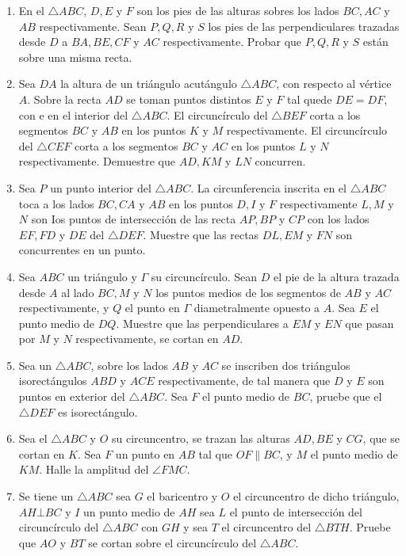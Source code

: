 \documentclass{book}
\begin{document}
\begin{enumerate}
        \item En el $\triangle ABC$, $D ,E$ y $F$ son los pies de las alturas sobres los lados $BC,AC$ y $AB$ respectivamente. Sean $P,Q,R$ y $S$ los pies de las perpendiculares trazadas desde $D$ a $BA, BE, CF$ y $AC$ respectivamente. Probar que $P, Q, R$ y $S$ están sobre una misma recta.
        \item Sea $DA$ la altura de un triángulo acutángulo $\triangle ABC$, con respecto al vértice $A$. Sobre la recta $AD$ se toman puntos distintos $E$ y $F$ tal quede $DE=DF$, con e en el interior del $\triangle ABC$. El circuncírculo del $\triangle BEF$ corta a los segmentos $BC$ y $AB$ en los puntos $K$ y $M$ respectivamente. El circuncírculo del $\triangle CEF$ corta a los segmentos $BC$ y $AC$ en los puntos $L$ y $N$ respectivamente. Demuestre que $AD, KM$ y $LN$ concurren.
        \item Sea $P$ un punto interior del $\triangle ABC$. La circunferencia inscrita en el $\triangle ABC$ toca a los lados $BC,CA$ y $AB$ en los puntos $D,I$ y $F$ respectivamente $L,M$ y $N$ son Ios puntos de intersección de las recta $AP,BP$ y $CP$ con los lados $EF,FD$ y $DE$ del $\triangle DEF$. Muestre que las rectas $DL,EM$ y $FN$ son concurrentes en un punto.
        \item Sea $ABC$ un triángulo y $\Gamma$ su circuncírculo. Sean $D$ el pie de la altura trazada desde $A$ al lado $BC, M$ y $N$ los puntos medios de los segmentos de $AB$ y $AC$ respectivamente, y $Q$ el punto en $\Gamma$ diametralmente opuesto a $A$. Sea $E$ el punto medio de $DQ$. Muestre que las perpendiculares a $EM$ y $EN$ que pasan por $M$ y $N$ respectivamente, se cortan en $AD$.
        \item Sea un $\triangle ABC$, sobre los lados $AB$ y $AC$ se inscriben dos triángulos isorectángulos $ABD$ y $ACE$ respectivamente, de tal manera que $D$ y $E$ son puntos en exterior del $\triangle ABC$. Sea $F$ el punto medio de $BC$, pruebe que el $\triangle DEF$ es isorectángulo.
        \item Sea el $\triangle ABC$  y $O$ su circuncentro, se trazan las alturas $AD, BE$ y $CG$, que se cortan en $K$. Sea $F$ un punto en $AB$ tal que $OF \| BC$, y $M$ el punto medio de $KM$. Halle la amplitud del $\angle FMC$.
        \item Se tiene un $\triangle ABC$ sea $G$ el baricentro y $O$ el circuncentro de dicho triángulo, $AH \bot BC$ y $I$ un punto medio de $AH$ sea $L$ el punto de intersección del circuncírculo del $\triangle ABC$ con $GH$ y sea $T$ el circuncentro del $\triangle BTH$. Pruebe que $AO$ y $BT$ se cortan sobre el circuncírculo del $\triangle ABC$.

\end{enumerate}
\end{document}
